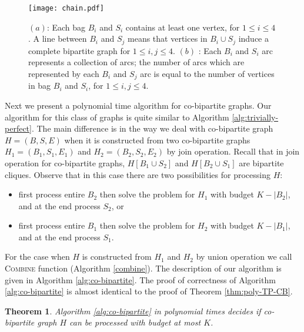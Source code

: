 \documentclass[letterpaper,11pt,abstracton]{scrartcl}
\newtheorem{tm}[theorem]{Theorem}
\begin{document}
\begin{figure}[htbp]
\begin{center}
\texttt{[image: chain.pdf]}
\caption{
$(a)$: Each bag $B_i$ and $S_i$ contains at least one vertex, for $1\leq i\leq 4$.
A line between $B_i$ and $S_j$ means that vertices in $B_i\cup S_j$ induce a complete bipartite graph for $1\leq i,j\leq 4$.
$(b)$ :
Each $B_i$ and $S_i$ arc represents a collection of arcs; the number of arcs which are represented by each $B_i$ and $S_j$ arc is equal to the number of
vertices in bag $B_i$ and $S_i$, for $1\leq i, j\leq 4$.
}
\label{fig:4}
\end{center}
\end{figure}


Next we present a polynomial time algorithm for co-bipartite graphs. Our algorithm for this class of graphs is quite similar to Algorithm \ref{alg:trivially-perfect}. The main difference is in the way we deal with co-bipartite graph $H=(B,S,E)$ when it is constructed from two co-bipartite graphs $H_1=(B_1,S_1,E_1)$ and $H_2=(B_2,S_2,E_2)$ by join operation. Recall that in join operation for co-bipartite graphs, $H[B_1\cup S_2]$ and $H[B_2\cup S_1]$ are bipartite cliques. Observe that in this case there are two possibilities for processing $H$:
\begin{itemize}
\item first process entire $B_2$ then solve the problem for $H_1$ with budget $K-|B_2|$, and at the end process $S_2$, or
\item first process entire $B_1$ then solve the problem for $H_2$ with budget $K-|B_1|$, and at the end process $S_1$.
\end{itemize}

For the case when $H$ is constructed from $H_1$ and $H_2$ by union operation we call \textsc{Combine} function (Algorithm \ref{combine}). The description of our algorithm is given in Algorithm \ref{alg:co-bipartite}. The proof of correctness of Algorithm \ref{alg:co-bipartite} is almost identical to the proof of Theorem \ref{thm:poly-TP-CB}.

\begin{tm}
Algorithm \ref{alg:co-bipartite} in polynomial times decides if co-bipartite graph $H$ can be processed with budget at most $K$.
\end{tm}
\end{document}
